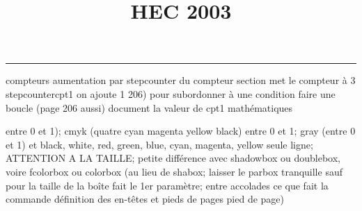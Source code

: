 \documentclass[11pt]{article}%
\title{\bf \vspace{-1cm} HEC 2003} %
\author{} %
\date{} %
\renewcommand{\headrulewidth}{0pt}%
\renewcommand{\footrulewidth}{0.4pt}%
\begin{document}
\maketitle %
\vspace{-1.2cm}\hrule %
\thispagestyle{fancy}

\vspace*{.4cm}


compteurs%
aumentation par stepcounter du compteur section%
met le compteur à 3%
stepcounter{cpt1} on ajoute 1%
206) pour subordonner à une condition %
faire une boucle (page 206 aussi) %
document la valeur de cpt1 
mathématiques\newcommand{\ch}{\operatorname{ch}} 
\newcommand{\sh}{\operatorname{sh}}
\renewcommand{\tanh}{\operatorname{th}}
\renewcommand{\sinh}{\operatorname{sh}}
\renewcommand{\cosh}{\operatorname{ch}}
\newcommand{\argsh}{\operatorname{argsh}}
\newcommand{\argch}{\operatorname{argch}}
\newcommand{\argth}{\operatorname{argth}}
\newcommand{\Id}{\operatorname{Id}}
\renewcommand{\leq}{\leq}
\renewcommand{\geq}{\geq }

\newcommand{\dlim}{\lim}
\newcommand{\dsum}{\sum}
\newcommand{\dprod}{\prod}



entre 0 et 1); cmyk (quatre cyan magenta yellow black) entre 0 et 1;
gray (entre 0 et 1) et black, white, red, green, blue, cyan, magenta,
yellow%
seule ligne; ATTENTION A LA TAILLE; petite différence avec shadowbox ou
doublebox, voire fcolorbox ou colorbox (au lieu de shabox; laisser le
parbox tranquille sauf pour la taille de la boîte
\newcommand{\Tbox}[1]{\begin{center} \shabox{\parbox{0.6
\linewidth}{#1}} \end{center}} %
fait le 1er paramètre; entre accolades ce que fait la commande
définition des en-têtes et pieds de pages\pagestyle{fancy}
\chead{}
\rfoot[ \ \thepage]{\thepage}
\cfoot{}
\lfoot{}
\thispagestyle{fancy} %
pied de page)\renewcommand{\footrulewidth}{0.4pt}
\renewcommand{\headrulewidth}{0.4pt}
\end{document}
